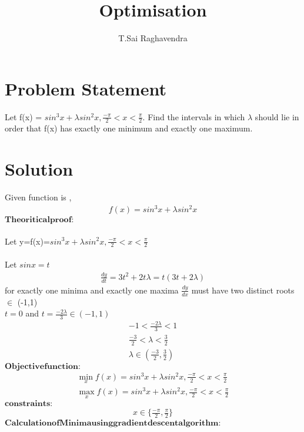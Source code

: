 \documentclass[journal,12pt,twocolumn]{IEEEtran}
\title{\mytitle}
\title{
Optimisation
}
\author{T.Sai Raghavendra}
\let\vec\mathbf
\begin{document}
\maketitle
\tableofcontents
\bigskip


\section{\textbf{Problem Statement}}
Let f(x) = $sin^3 x+\lambda sin^2 x, \frac{-\pi}{2} < x < \frac{\pi}{2} $. Find the intervals in which $\lambda$ should lie in order that f(x) has exactly one minimum and exactly one maximum.\\


\section{\textbf{Solution}}
Given function is ,
	\begin{align}
	\label{eq:one}
	f(x)= sin^3 x+\lambda sin^2 x
	\end{align}
	$\vec{Theoritical proof:}$\\ \\
Let y=f(x)=$sin^3 x+\lambda sin^2 x, \frac{-\pi}{2} < x < \frac{\pi}{2} $\\ \\
Let $sinx=t$
    \begin{align}
	 \frac{dy}{dt}=3t^2+2t\lambda=t(3t+2\lambda)
	 \end{align}
	 for exactly one minima and exactly one maxima  $\frac{dy}{dx} $ must have two distinct roots $\in$ (-1,1) \\
	 $t=0$ and $t=\frac{-2\lambda}{3}\in (-1,1)$\\
	 \begin{align}
	 -1<\frac{-2\lambda}{3}<1\\
	 \frac{-3}{2}<\lambda<\frac{3}{2}\\
	 \lambda\in (\frac{-3}{2},\frac{3}{2})
	 \end{align}
	$\vec{Objective function:}$
	\begin{align}
	\min_xf(x)= sin^3 x+\lambda sin^2 x, \frac{-\pi}{2} < x < \frac{\pi}{2} \\
	\max_xf(x)= sin^3 x+\lambda sin^2 x, \frac{-\pi}{2} < x < \frac{\pi}{2} 
        \end{align}
	$\vec{constraints:}$
	\begin{align}
		x \in \{ \frac{-\pi}{2}, \frac{\pi}{2}\} 
	\end{align}
\small$\vec{Calculation of Minima using gradient descent algorithm:}$
\end{document}
